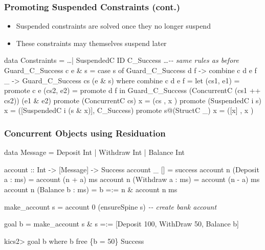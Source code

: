 \documentclass[
,xcolor=dvipsnames
]{beamer}
\newcommand{\comment}[1]{\textsl{-{}- #1}}
\begin{document}
\begin{frame}[fragile]%
\frametitle{Promoting Suspended Constraints (cont.)}

\begin{itemize}
\item Suspended constraints are solved once they no longer suspend
\item These constraints may themselves suspend later
\end{itemize}

\begin{haskell}
data Constraints = \ldots | SuspendedC ID \alert{C_Success} \medskip
\ldots \comment{same rules as before}
Guard_C_Success c e    \& s = case s of
  Guard_C_Success d f -> combine c d e f
  _                   -> Guard_C_Success cs (e \& s)
  where
  combine c d e f = let (cs1, e1) = promote c e
                        (cs2, e2) = promote d f
                    in Guard_C_Success (ConcurrentC (cs1 ++ cs2))
                                       (e1 \& e2) \medskip
  promote (ConcurrentC cs) x = (cs                    , x        )
  \alert{promote (SuspendedC i s) x = ([SuspendedC i (s \& x)], C_Success)}
  promote s@(StructC    _) x = ([x]                   , x        )
\end{haskell}

\end{frame}


\begin{frame}[fragile]%
\frametitle{Concurrent Objects using Residuation}

\begin{curry}
data Message = Deposit Int | Withdraw Int | Balance Int

account :: Int -> [Message] -> Success
account _ []                 =  success
account n (Deposit  a : ms)  =  account (n + a) ms
account n (Withdraw a : ms)  =  account (n - a) ms
account n (Balance  b : ms)  =  b =:= n \& account n ms

make_account s = account 0 (ensureSpine s) \comment{create bank account}

goal b = make_account s
       \& s =:= [Deposit 100, WithDraw 50, Balance b]
\end{curry}

\begin{kics2}
kics2> goal b where b free
\{b = 50\} Success
\end{kics2}

\end{frame}
\end{document}
